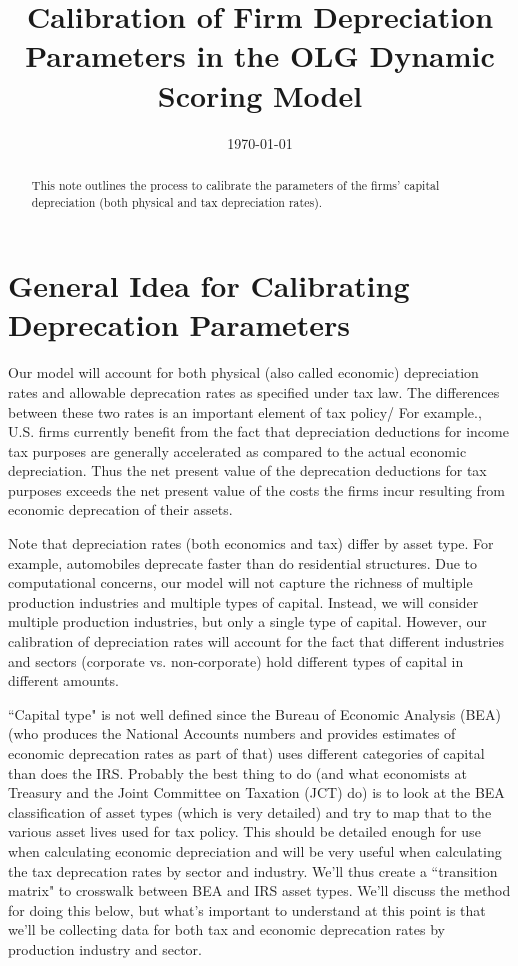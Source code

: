 \documentclass[article,11pt,letterpaper,fleqn]{article}
\title{Calibration of Firm Depreciation Parameters in the OLG Dynamic Scoring Model}
\date{\today}
\theoremstyle{definition}
\numberwithin{equation}{section}
\begin{document}

\maketitle



\begin{abstract}
This note outlines the process to calibrate the parameters of the firms' capital depreciation (both physical and tax depreciation rates).
\end{abstract}

\section*{General Idea for Calibrating Deprecation Parameters}

Our model will account for both physical (also called economic) depreciation rates and allowable deprecation rates as specified under tax law.  The differences between these two rates is an important element of tax policy/  For example., U.S. firms currently benefit from the fact that depreciation deductions for income tax purposes are generally accelerated as compared to the actual economic depreciation.  Thus the net present value of the deprecation deductions for tax purposes exceeds the net present value of the costs the firms incur resulting from economic deprecation of their assets.  

Note that depreciation rates (both economics and tax) differ by asset type.  For example, automobiles deprecate faster than do residential structures.  Due to computational concerns, our model will not capture the richness of multiple production industries and multiple types of capital.  Instead, we will consider multiple production industries, but only a single type of capital.  However, our calibration of depreciation rates will account for the fact that different industries and sectors (corporate vs. non-corporate) hold different types of capital in different amounts.  

``Capital type" is not well defined since the Bureau of Economic Analysis (BEA) (who produces the National Accounts numbers and provides estimates of economic deprecation rates as part of that) uses different categories of capital than does the IRS.  Probably the best thing to do (and what economists at Treasury and the Joint Committee on Taxation (JCT) do) is to look at the BEA classification of asset types (which is very detailed) and try to map that to the various asset lives used for tax policy.  This should be detailed enough for use when calculating economic depreciation and will be very useful when calculating the tax deprecation rates by sector and industry.  We'll thus create a ``transition matrix" to crosswalk between BEA and IRS asset types.  We'll discuss the method for doing this below, but what's important to understand at this point is that we'll be collecting data for both tax and economic deprecation rates  by production industry and sector.
\end{document}

